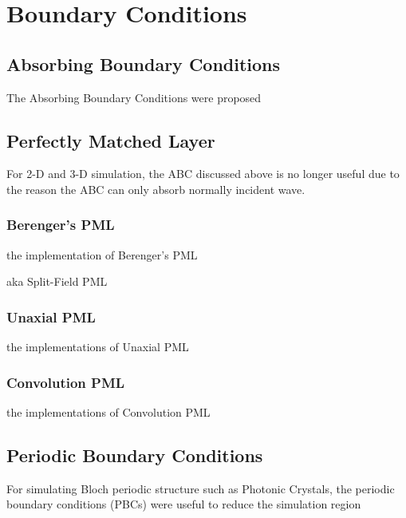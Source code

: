 \section{Boundary Conditions}

\subsection{Absorbing Boundary Conditions}

The Absorbing Boundary Conditions were proposed

\subsection{Perfectly Matched Layer}

For 2-D and 3-D simulation, the ABC discussed above is no longer useful due to the reason the ABC can only absorb
normally incident wave.

\subsubsection{Berenger's PML}
the implementation of Berenger's PML

aka Split-Field PML
\subsubsection{Unaxial PML}
the implementations of Unaxial PML
\subsubsection{Convolution PML}
the implementations of Convolution PML

\subsection{Periodic Boundary Conditions}

For simulating Bloch periodic structure such as Photonic Crystals, the periodic boundary conditions (PBCs) were useful
to reduce the simulation region

